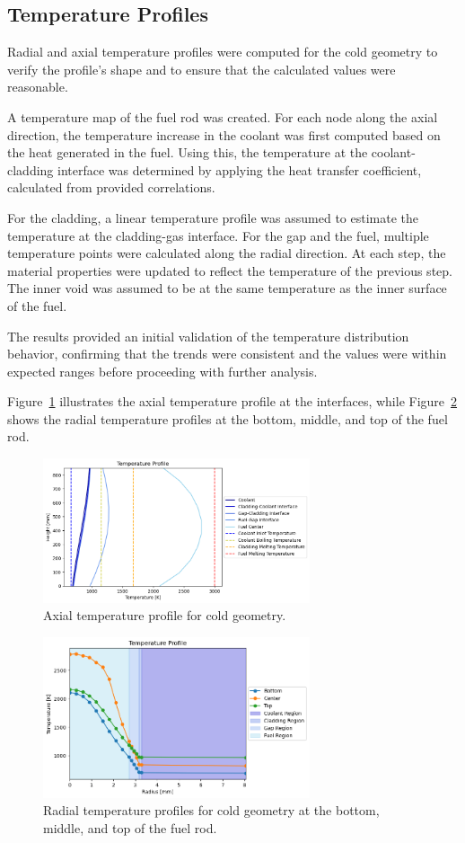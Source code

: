 \subsection{Temperature Profiles}
Radial and axial temperature profiles were computed for the cold geometry to verify the profile's shape and to ensure that the calculated values were reasonable.

A temperature map of the fuel rod was created. For each node along the axial direction, the temperature increase in the coolant was first computed based on the heat generated in the fuel. Using this, the temperature at the coolant-cladding interface was determined by applying the heat transfer coefficient, calculated from provided correlations.

For the cladding, a linear temperature profile was assumed to estimate the temperature at the cladding-gas interface. For the gap and the fuel, multiple temperature points were calculated along the radial direction. At each step, the material properties were updated to reflect the temperature of the previous step. The inner void was assumed to be at the same temperature as the inner surface of the fuel.

The results provided an initial validation of the temperature distribution behavior, confirming that the trends were consistent and the values were within expected ranges before proceeding with further analysis.

Figure~\ref{fig:axial_temp_profile} illustrates the axial temperature profile at the interfaces, while Figure~\ref{fig:radial_temp_profile} shows the radial temperature profiles at the bottom, middle, and top of the fuel rod.

\begin{figure}[H]
\centering
\includegraphics[width=0.7\textwidth]{axial_temp_profile_cold.png}
\caption{Axial temperature profile for cold geometry.}
\label{fig:axial_temp_profile}
\end{figure}

\begin{figure}[H]
\centering
\includegraphics[width=0.7\textwidth]{radial_temp_profile_cold.png}
\caption{Radial temperature profiles for cold geometry at the bottom, middle, and top of the fuel rod.}
\label{fig:radial_temp_profile}
\end{figure}
